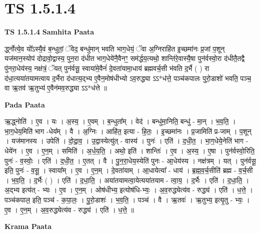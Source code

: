 \documentclass[17pt]{extarticle}
\begin{document}
\section*{ TS 1.5.1.4 }

\textbf{TS 1.5.1.4 } \newline
\textbf{Samhita Paata} \newline

र्द्ध्नोत्ये॒व यो᳚ऽस्यै॒वं ब॒न्धुतां॒ ॅवेद॒ बन्धु॑मान् भवति भाग॒धेयं॒ ॅवा अ॒ग्निराहि॑त इ॒च्छमा॑नः प्र॒जां प॒शून् यज॑मान॒स्योप॑ दोद्रावो॒द्वास्य॒ पुन॒रा द॑धीत भाग॒धेये॑नै॒वैनꣳ॒॒ सम॑र्द्धय॒त्यथो॒ शान्ति॑रे॒वास्यै॒षा पुन॑र्वस्वो॒रा द॑धीतै॒तद्वै पु॑नरा॒धेय॑स्य॒ नक्ष॑त्रं॒ ॅयत् पुन॑र्वसू॒ स्वाया॑मे॒वैनं॑ दे॒वता॑यामा॒धाय॑ ब्रह्मवर्च॒सी भ॑वति द॒र्भै ( ) रा द॑धा॒त्यया॑तयामत्वाय द॒र्भैरा द॑धात्य॒द्भ्य ए॒वैन॒मोष॑धीभ्यो ऽव॒रुद्ध्या ऽऽ*ध॑त्ते॒ पञ्च॑कपालः पुरो॒डाशो॑ भवति॒ पञ्च॒ वा ऋ॒तव॑ ऋ॒तुभ्य॑ ए॒वैन॑मव॒रुद्ध्या ऽऽ*ध॑त्ते ॥ \newline

\textbf{Pada Paata} \newline

ऋ॒द्ध्नोति॑ । ए॒व । यः । अ॒स्य॒ । ए॒वम् । ब॒न्धुता᳚म् । वेद॑ । बन्धु॑मा॒निति॒ बन्धु॑ - मा॒न् । भ॒व॒ति॒ । भा॒ग॒धेय॒मिति॑ भाग -धेय᳚म् । वै । अ॒ग्निः । आहि॑त॒ इत्या - हि॒तः॒ । इ॒च्छमा॑नः । प्र॒जामिति॑ प्र-जाम् । प॒शून् । यज॑मानस्य । उपेति॑ । दो॒द्रा॒व॒ । उ॒द्वास्येत्यु॑त् - वास्य॑ । पुनः॑ । एति॑ । द॒धी॒त॒ । भा॒ग॒धेये॒नेति॑ भाग - धेये॑न । ए॒व । ए॒न॒म् । समिति॑ । अ॒र्ध॒य॒ति॒ । अथो॒ इति॑ । शान्तिः॑ । ए॒व । अ॒स्य॒ । ए॒षा । पुन॑र्वस्वो॒रिति॒ पुनः॑ - व॒स्वोः॒ । एति॑ । द॒धी॒त॒ । ए॒तत् । वै । पु॒न॒रा॒धेय॒स्येति॑ पुनः - आ॒धेय॑स्य । नक्ष॑त्रम् । यत् । पुन॑र्वसू॒ इति॒ पुनः॑ - व॒सू॒ । स्वाया᳚म् । ए॒व । ए॒न॒म् । दे॒वता॑याम् । आ॒धायेत्या᳚ - धाय॑ । ब्र॒ह्म॒व॒र्च॒सीति॑ ब्रह्म - व॒र्च॒सी । भ॒व॒ति॒ । द॒र्भैः ( ) । एति॑ । द॒धा॒ति॒ । अया॑तयामत्वा॒येत्यया॑तयाम - त्वा॒य॒ । द॒र्भैः । एति॑ । द॒धा॒ति॒ । अ॒द्भ्य इत्य॑त् - भ्यः । ए॒व । ए॒न॒म् । ओष॑धीभ्य॒ इत्योष॑धि-भ्यः॒ । अ॒व॒रुद्ध्येत्य॑व - रुद्ध्य॑ । एति॑ । ध॒त्ते॒ । पञ्च॑कपाल॒ इति॒ पञ्च॑ - क॒पा॒लः॒ । पु॒रो॒डाशः॑ । भ॒व॒ति॒ । पञ्च॑ । वै । ऋ॒तवः॑ । ऋ॒तुभ्य॒ इत्यृ॒तु - भ्यः॒ । ए॒व । ए॒न॒म् । अ॒व॒रुद्ध्येत्य॑व - रुद्ध्य॑ । एति॑ । ध॒त्ते॒ ॥  \newline


\textbf{Krama Paata} \newline
\end{document}
